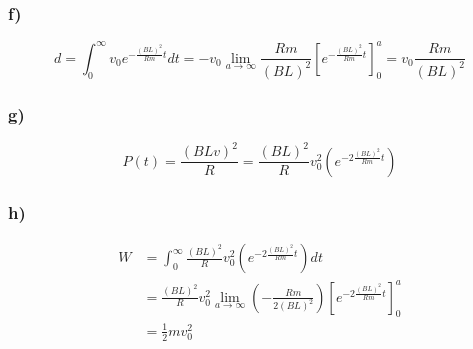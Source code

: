 \documentclass[../homework.tex]{subfiles}
\begin{document}
\subsubsection*{f)}
\begin{equation*}
    d = \int_{0}^{\infty} v_0 e^{-\frac{(BL)^2}{Rm}t} dt = -v_0 \lim_{a \to \infty} \frac{Rm}{(BL)^2} \left[
        e^{-\frac{(BL)^2}{Rm}t}
    \right]^a_0 = v_0 \frac{Rm}{(BL)^2}
\end{equation*}

\subsubsection*{g)}
\begin{equation*}
    P(t) = \frac{(BLv)^2}{R} = \frac{(BL)^2}{R} v_0^2
    \left(
        e^{-2\frac{(BL)^2}{Rm}t}
    \right)
\end{equation*}

\subsubsection*{h)}
\begin{align*}
    W &= \int_{0}^{\infty} \frac{(BL)^2}{R} v_0^2
    \left(
        e^{-2\frac{(BL)^2}{Rm}t}
    \right) dt \\
     &= \frac{(BL)^2}{R} v_0^2 \lim_{a \to \infty}
     \left(-\frac{Rm}{2(BL)^2}\right)
     \left[
        e^{-2\frac{(BL)^2}{Rm}t}
     \right]^a_0 \\
     &= \frac{1}{2} m v_0^2
\end{align*}
\end{document}
